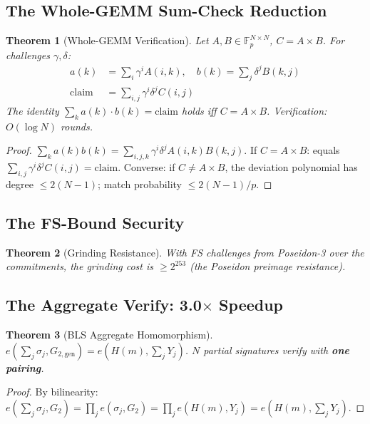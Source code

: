 \documentclass[11pt, a4paper]{article}
\newtheorem{theorem}{Theorem}
\begin{document}
\subsection{The Whole-GEMM Sum-Check Reduction}

\begin{theorem}[Whole-GEMM Verification]
\label{thm:gemm}
Let $A, B \in \mathbb{F}_p^{N \times N}$, $C = A \times B$. For
challenges $\gamma, \delta$:
\begin{align}
a(k) &= \textstyle\sum_i \gamma^i A(i,k), \quad
b(k) = \sum_j \delta^j B(k,j)\\
\text{claim} &= \textstyle\sum_{i,j} \gamma^i \delta^j C(i,j)
\end{align}
The identity $\sum_k a(k) \cdot b(k) = \text{claim}$ holds iff
 $C = A \times B$. Verification: $O(\log N)$ rounds.
\end{theorem}
\begin{proof}
 $\sum_k a(k) b(k) = \sum_{i,j,k} \gamma^i \delta^j A(i,k) B(k,j)$.
If $C = A \times B$: equals $\sum_{i,j} \gamma^i \delta^j C(i,j) =
\text{claim}$. Converse: if $C \neq A \times B$, the deviation
polynomial has degree $\le 2(N-1)$; match probability $\le 2(N-1)/p$.
\end{proof}

\subsection{The FS-Bound Security}

\begin{theorem}[Grinding Resistance]
With FS challenges from Poseidon-3 over the commitments, the grinding
cost is $\ge 2^{253}$ (the Poseidon preimage resistance).
\end{theorem}

\subsection{The Aggregate Verify: 3.0$\times$ Speedup}

\begin{theorem}[BLS Aggregate Homomorphism]
\label{thm:bls-agg}
 $e\!\left(\sum_j \sigma_j, G_{2,\mathrm{gen}}\right) =
e\!\left(H(m), \sum_j Y_j\right)$. $N$ partial signatures verify
with \textbf{one pairing}.
\end{theorem}
\begin{proof}
By bilinearity: $e(\sum_j \sigma_j, G_2) = \prod_j e(\sigma_j, G_2)
= \prod_j e(H(m), Y_j) = e(H(m), \sum_j Y_j)$.
\end{proof}
\end{document}
